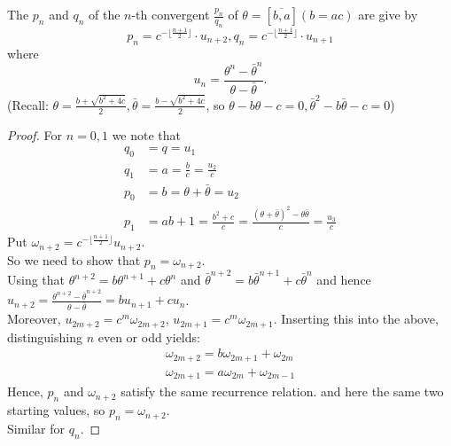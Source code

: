 \documentclass[NumTh.tex]{subfiles}
\begin{document}
\begin{theorem}\label{1_2_5}
  The $p_n$ and $q_n$ of the $n$-th convergent $\frac{p_n}{q_n}$ of $\theta = [\overbar{b,a}] (b = ac)$ are give by
  \[ p_n = c^{-\lfloor\frac{n+1}{2} \rfloor} \cdot u_{n+2}, q_n =c^{-\lfloor\frac{n+1}{2} \rfloor} \cdot u_{n+1}\]
  where
  \[ u_n = \frac{\theta^n - \bar{\theta}^n}{\theta - \bar{\theta}}.\]
  (Recall: $\theta = \frac{b+\sqrt{b^2+4c}}{2}, \bar{\theta} = \frac{b-\sqrt{b^2+4c}}{2}$, so $\theta - b\theta -c =0, \bar{\theta}^2 - b \bar{\theta} -c = 0$)
\end{theorem}

\begin{proof}
  For $n = 0, 1$ we note that 
  \begin{align}
  q_0 &= q = u_1\\
  q_1 &= a = \frac{b}{c} = \frac{u_2}{c}\\
  p_0 &= b = \theta + \bar{\theta} = u_2\\
  p_1 &= a b + 1 = \frac{b^2+c}{c} = \frac{(\theta + \bar{\theta})^2 - \theta \bar{\theta}}{c} = \frac{u_3}{c}
 \end{align}
 Put $\omega_{n+2} = c^{-\lfloor\frac{n+1}{2} \rfloor} u_{n+2}$.\\
 So we need to show that $p_n = \omega_{n+2}$.\\
 Using that $\theta^{n+2} = b \theta^{n+1} + c \theta^n$ and $\bar{\theta}^{n+2} = b \bar{\theta}^{n+1} + c \bar{\theta}^n$
 and hence $u_{n+2} = \frac{\theta^{n+2} - \bar{\theta}^{n+2}}{\theta - \bar{\theta}} = b u_{n+1} + c u_n$.\\
 Moreover, $u_{2m+2} = c^m \omega_{2m+2}$, $u_{2m+1} = c^m \omega_{2m+1}$.
 Inserting this into the above, distinguishing $n$ even or odd yields:
 \begin{align}
   \omega_{2m+2} = b \omega_{2m+1} + \omega_{2m}\\
   \omega_{2m+1} = a \omega_{2m} + \omega_{2m - 1}
 \end{align}
 Hence, $p_n$ and $\omega_{n+2}$ satisfy the same recurrence relation. and here the same two starting values, so $p_n = \omega_{n+2}$.\\
 Similar for $q_n$.
\end{proof}
\end{document}
